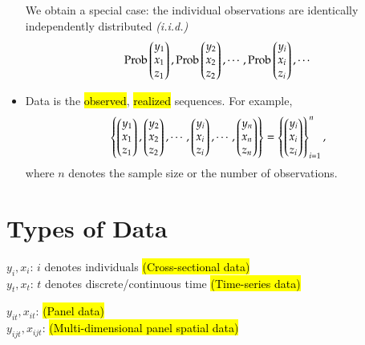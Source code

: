 \documentclass{Theme}
\begin{document}
\begin{itemize}
    We obtain a special case: the individual
    observations are identically independently
    distributed {\it (i.i.d.)}
    \[
        \text{Prob}\left(\begin{matrix}
        y_1 \\ x_1 \\ z_1
        \end{matrix}\right),
        \text{Prob}\left(\begin{matrix}
        y_2 \\ x_2 \\ z_2
        \end{matrix}\right),\cdots,
        \text{Prob}\left(\begin{matrix}
        y_i \\ x_i \\ z_i
        \end{matrix}\right),\cdots
    \]
    \item Data is the \hl{observed}, \hl{realized}
    sequences. For example,
    \[
        \left\{
        \begin{pmatrix} 
        y_1 \\ x_1 \\ z_1
         \end{pmatrix},
        \begin{pmatrix}
        y_2 \\ x_2 \\ z_2
        \end{pmatrix},\cdots,
        \begin{pmatrix}
        y_i \\ x_i \\ z_i
        \end{pmatrix},\cdots,
        \begin{pmatrix}
        y_n \\ x_n \\ z_n
        \end{pmatrix}
        \right\}
        =
        \left\{ 
        \begin{pmatrix}
        y_i \\ x_i \\ z_i
        \end{pmatrix}\right\}^n_{i=1},
    \]
    where $n$ denotes the sample size or the 
    number of observations.
\end{itemize}

\section{Types of Data}

\begin{description}[leftmargin=!,labelwidth= \widthof{\bfseries Multiple-indexed}]
    \item[Single-indexed]
    $y_i, x_i$: $i$ denotes individuals
    \hl{(Cross-sectional data)} \\
    $y_t, x_t$: $t$ denotes discrete/continuous
    time \hl{(Time-series data)}
    \item[Multiple-indexed]
    $y_{it}, x_{it}$: \hl{(Panel data)} \\
    $y_{ijt}, x_{ijt}$: \hl{(Multi-dimensional panel spatial data)}
\end{description}
\end{document}
